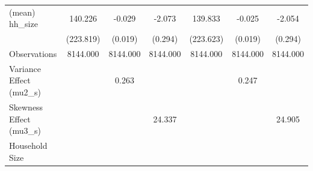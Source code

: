 \begin{table}[htbp]
\begin{tabular}{l*{6}{c}}
(mean) hh\_size  &  140.226         &   -0.029         &   -2.073\sym{***}&  139.833         &   -0.025         &   -2.054\sym{***}\\
                &(223.819)         &  (0.019)         &  (0.294)         &(223.623)         &  (0.019)         &  (0.294)         \\
\midrule
Observations    & 8144.000         & 8144.000         & 8144.000         & 8144.000         & 8144.000         & 8144.000         \\
Variance Effect (mu2\_s)&                  &    0.263         &                  &                  &    0.247         &                  \\
Skewness Effect (mu3\_s)&                  &                  &   24.337         &                  &                  &   24.905         \\
Household Size  &                  &                  &                  &                  &                  &                  \\
\bottomrule
\end{tabular}
\end{table}
